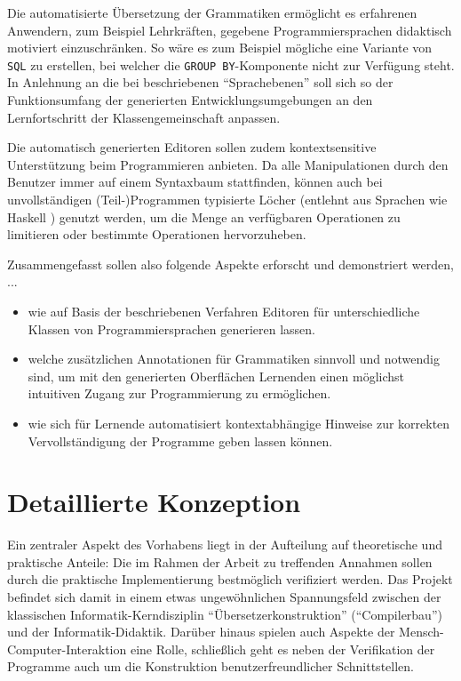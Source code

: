 \documentclass[paper=a4,fontsize=12pt,parskip=half]{scrartcl}
\begin{document}
Die automatisierte Übersetzung der Grammatiken ermöglicht es erfahrenen Anwendern, zum Beispiel Lehrkräften, gegebene Programmiersprachen didaktisch motiviert einzuschränken. So wäre es zum Beispiel mögliche eine Variante von \texttt{SQL} zu erstellen, bei welcher die \texttt{GROUP BY}-Komponente nicht zur Verfügung steht. In Anlehnung an die bei \cite{klaeren_macht_2007} beschriebenen \enquote{Sprachebenen} soll sich so der Funktionsumfang der generierten Entwicklungsumgebungen an den Lernfortschritt der Klassengemeinschaft anpassen.

Die automatisch generierten Editoren sollen zudem kontextsensitive Unterstützung beim Programmieren anbieten. Da alle Manipulationen durch den Benutzer immer auf einem Syntaxbaum stattfinden, können auch bei unvollständigen (Teil-)Programmen typisierte Löcher (entlehnt aus Sprachen wie Haskell \cite{jones_haskell_2014}) genutzt werden, um die Menge an verfügbaren Operationen zu limitieren oder bestimmte Operationen hervorzuheben.

Zusammengefasst sollen also folgende Aspekte erforscht und demonstriert werden, ...

\begin{itemize}
\item wie auf Basis der beschriebenen Verfahren Editoren für unterschiedliche Klassen von Programmiersprachen generieren lassen.
\item welche zusätzlichen Annotationen für Grammatiken sinnvoll und notwendig sind, um mit den generierten Oberflächen Lernenden einen möglichst intuitiven Zugang zur Programmierung zu ermöglichen.
\item wie sich für Lernende automatisiert kontextabhängige Hinweise zur korrekten Vervollständigung der Programme geben lassen können.
\end{itemize}


\section{Detaillierte Konzeption}

Ein zentraler Aspekt des Vorhabens liegt in der Aufteilung auf theoretische und praktische Anteile: Die im Rahmen der Arbeit zu treffenden Annahmen sollen durch die praktische Implementierung bestmöglich verifiziert werden. Das Projekt befindet sich damit in einem etwas ungewöhnlichen Spannungsfeld zwischen der klassischen Informatik-Kerndisziplin \enquote{Übersetzerkonstruktion} (\enquote{Compilerbau}) und der Informatik-Didaktik. Darüber hinaus spielen auch Aspekte der Mensch-Computer-Interaktion eine Rolle, schließlich geht es neben der Verifikation der Programme auch um die Konstruktion benutzerfreundlicher Schnittstellen.
\end{document}
